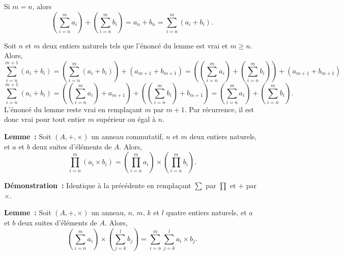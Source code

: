     Si $m = n$, alors 
    \begin{equation*}
        \left( \sum_{i=n}^m a_i \right) + \left( \sum_{i=n}^m b_i \right)
        = a_n + b_n
        = \sum_{i=n}^m (a_i + b_i).
    \end{equation*}

    Soit $n$ et $m$ deux entiers naturels tels que l'énoncé du lemme est vrai et $m \geq n$.
    Alors, 
    \begin{equation*}
        \sum_{i=n}^{m+1} (a_i + b_i) 
        = \left( \sum_{i=n}^m (a_i + b_i) \right) + (a_{m+1} + b_{m+1})
        = \left( \left( \sum_{i=n}^m a_i \right) + \left( \sum_{i=n}^m b_i \right) \right) + (a_{m+1} + b_{m+1})
    \end{equation*}
    \begin{equation*}
        \sum_{i=n}^{m+1} (a_i + b_i) 
        = \left( \left( \sum_{i=n}^m a_i \right) + a_{m+1} \right) + \left( \left( \sum_{i=n}^m b_i \right) + b_{m+1} \right)
        = \left( \sum_{i=n}^m a_i \right) + \left( \sum_{i=n}^m b_i \right) .
    \end{equation*}
    L'énoncé du lemme reste vrai en remplaçant $m$ par $m+1$.
    Par récurrence, il est donc vrai pour tout entier $m$ supérieur ou égal à $n$. 

    \done

\medskip

\noindent\textbf{Lemme :} Soit $(A, +, \times)$ un anneau commutatif, $n$ et $m$ deux entiers naturels, et $a$ et $b$ deux suites d'éléments de $A$. 
    Alors,
    \begin{equation*}
        \prod_{i=n}^m (a_i \times b_i) = \left( \prod_{i=n}^m a_i \right) \times \left( \prod_{i=n}^m b_i \right) .
    \end{equation*}

\medskip

\noindent\textbf{Démonstration :} Identique à la précédente en remplaçant $\sum$ par $\prod$ et $+$ par $\times$.

\medskip

\noindent\textbf{Lemme :} Soit $(A, +, \times)$ un anneau, $n$, $m$, $k$ et $l$ quatre entiers naturels, et $a$ et $b$ deux suites d'éléments de $A$. 
    Alors,
    \begin{equation*}
        \left( \sum_{i=n}^m a_i \right) \times \left( \sum_{j=k}^l b_j \right) = \sum_{i=n}^m \sum_{j=k}^l a_i \times b_j .
    \end{equation*}

\medskip

